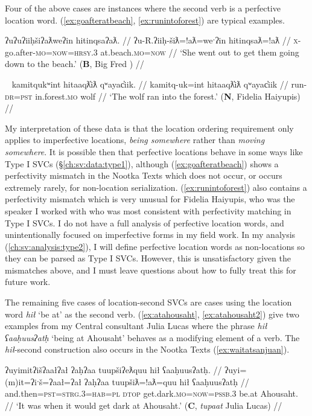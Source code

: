 Four of the above cases are instances where the second verb is a perfective location word. (\ref{ex:goafteratbeach}, \ref{ex:runintoforest}) are typical examples.

\ex \label{ex:goafteratbeach}
\begingl
\glpreamble ʔuʔuʔiiḥšiʔaƛweʔin hitinqsaʔaƛ. //
\gla ʔu-R.ʔiiḥ-šiƛ=!aƛ=weˑʔin hitinqsaƛ=!aƛ  //
\glb \textsc{x}-go.after-\textsc{mo}=\textsc{now}=\textsc{hrsy.3} at.beach.\textsc{mo}=\textsc{now} //
\glft `She went out to get them going down to the beach.' (\textbf{B}, Big Fred \citep[54]{sapir1939}) //
\endgl
\xe

\ex~ \label{ex:runintoforest}
\begingl
\glpreamble kamitqukʷint hitaaqƛ̓iƛ qʷayac̓iik. //
\gla kamitq-uk=int hitaaqƛ̓iƛ qʷayac̓iik  //
\glb run-\textsc{dr}=\textsc{pst} in.forest.\textsc{mo} wolf //
\glft `The wolf ran into the forest.' (\textbf{N}, Fidelia Haiyupis) //
\endgl
\xe

My interpretation of these data is that the location ordering requirement only applies to imperfective locations, \textit{being somewhere} rather than \textit{moving somewhere}. It is possible then that perfective locations behave in some ways like Type I SVCs (\S\ref{ch:sv:data:type1}), although (\ref{ex:goafteratbeach}) shows a perfectivity mismatch in the Nootka Texts which does not occur, or occurs extremely rarely, for non-location serialization. (\ref{ex:runintoforest}) also contains a perfectivity mismatch which is very unusual for Fidelia Haiyupis, who was the speaker I worked with who was most consistent with perfectivity matching in Type I SVCs. I do not have a full analysis of perfective location words, and unintentionally focused on imperfective forms in my field work. In my analysis (\ref{ch:sv:analysis:type2}), I will define perfective location words as non-locations so they can be parsed as Type I SVCs. However, this is unsatisfactory given the mismatches above, and I must leave questions about how to fully treat this for future work.

The remaining five cases of location-second SVCs are cases using the location word \textit{hił} `be at' as the second verb. (\ref{ex:atahousaht}, \ref{ex:atahousaht2}) give two examples from my Central consultant Julia Lucas where the phrase \textit{hił ʕaaḥuusʔatḥ} `being at Ahousaht' behaves as a modifying element of a verb. The \textit{hił}-second construction also occurs in the Nootka Texts (\ref{ex:waitatsanjuan}).

\ex \label{ex:atahousaht}
\begingl
\glpreamble ʔuyimitʔišʔaałʔał ʔaḥʔaa tuupšiʔeƛquu hił ʕaaḥuusʔatḥ. //
\gla ʔuyi=(m)it=ʔiˑš=ʔaał=ʔał ʔaḥʔaa tuupšiƛ=!aƛ=quu hił ʕaaḥuusʔatḥ  //
\glb and.then=\textsc{pst}=\textsc{strg.3}=\textsc{hab}=\textsc{pl} \textsc{dtop} get.dark.\textsc{mo}=\textsc{now}=\textsc{pssb.3} be.at Ahousaht. //
\glft `It was when it would get dark at Ahousaht.' (\textbf{C}, \textit{tupaat} Julia Lucas) //
\endgl
\xe

